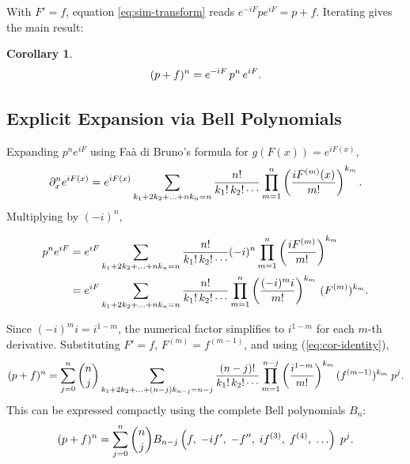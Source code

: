 \documentclass{book}
\newtheorem{corollary}{Corollary}
\begin{document}
With $F' = f$, equation \ref{eq:sim-transform} reads $e^{- iF} pe^{iF} = p +
f$. Iterating gives the main result:

\begin{corollary}
  \begin{equation}
    (p + f)^n = e^{- iF}  \hspace{0.17em} p^n  \hspace{0.17em} e^{iF} .
    \label{eq:cor-identity}
  \end{equation}
\end{corollary}

\subsection{Explicit Expansion via Bell Polynomials}

Expanding $p^n e^{iF}$ using Faà di Bruno's formula for $g (F (x)) = e^{iF
(x)}$,
\[ \partial_x^n e^{iF (x)} = e^{iF (x)}  \sum_{k_1 + 2 k_2 + \ldots + nk_n =
   n} \frac{n!}{k_1 ! \hspace{0.17em} k_2 ! \cdots}  \prod_{m = 1}^n \left(
   \frac{iF^{(m)} (x)}{m!} \right)^{k_m} . \]
Multiplying by $(- i)^n$,

\begin{align}
  p^n e^{iF} & = e^{iF}  \sum_{k_1 + 2 k_2 + \ldots + nk_n = n} \frac{n!}{k_1
  ! \hspace{0.17em} k_2 ! \cdots}  (- i)^n  \prod_{m = 1}^n \left(
  \frac{iF^{(m)}}{m!} \right)^{k_m} \nonumber\\
  & = e^{iF}  \sum_{k_1 + 2 k_2 + \ldots + nk_n = n} \frac{n!}{k_1 !
  \hspace{0.17em} k_2 ! \cdots}  \prod_{m = 1}^n \left( \frac{(- i)^m i}{m!}
  \right)^{k_m} \hspace{0.17em} (F^{(m)})^{k_m} . 
\end{align}

Since $(- i)^m i = i^{1 - m}$, the numerical factor simplifies to $i^{1 - m}$
for each $m$-th derivative. Substituting $F' = f$, $F^{(m)} = f^{(m - 1)}$,
and using (\ref{eq:cor-identity}),
\begin{equation}
  (p + f)^n = \sum_{j = 0}^n \binom{n}{j} \sum_{k_1 + 2 k_2 + \ldots + (n - j)
  k_{n - j} = n - j} \frac{(n - j) !}{k_1 ! \hspace{0.17em} k_2 ! \cdots} 
  \prod_{m = 1}^{n - j} \left( \frac{i^{1 - m}}{m!} \right)^{k_m} (f^{(m -
  1)})^{k_m}  \hspace{0.27em} p^j . \label{eq:expansion}
\end{equation}
This can be expressed compactly using the complete Bell polynomials $B_n$:
\begin{equation}
  (p + f)^n = \sum_{j = 0}^n \binom{n}{j} B_{n - j} \left( f, \hspace{0.27em}
  - if', \hspace{0.27em} - f'', \hspace{0.27em} if^{(3)}, \hspace{0.27em}
  f^{(4)}, \hspace{0.27em} \ldots \right)  \hspace{0.27em} p^j .
  \label{eq:bell-expansion}
\end{equation}
\end{document}
